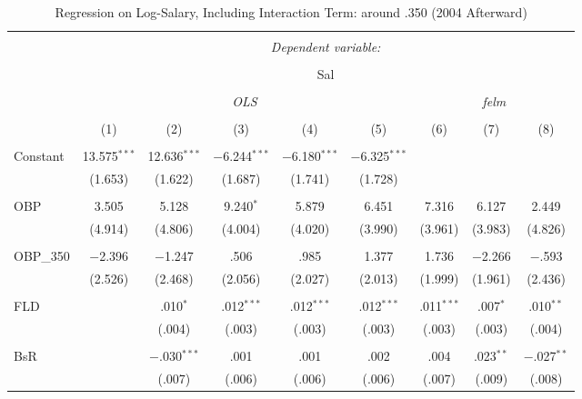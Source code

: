 
\begin{table}[H] \centering
  \caption{Regression on Log-Salary, Including Interaction Term: around .350 (2004 Afterward)} 
  \label{OBP350_D}
\tiny
\begin{tabular}{@{\extracolsep{5pt}}lcccccccc}
\\[-1.8ex]\hline
\hline \\[-1.8ex]
 & \multicolumn{8}{c}{\textit{Dependent variable:}} \\
\cline{2-9}
\\[-1.8ex] & \multicolumn{8}{c}{Sal} \\
\\[-1.8ex] & \multicolumn{5}{c}{\textit{OLS}} & \multicolumn{3}{c}{\textit{felm}} \\
\\[-1.8ex] & (1) & (2) & (3) & (4) & (5) & (6) & (7) & (8)\\
\hline \\[-1.8ex]
 Constant & 13.575$^{***}$ & 12.636$^{***}$ & $-$6.244$^{***}$ & $-$6.180$^{***}$ & $-$6.325$^{***}$ &  &  &  \\
  & (1.653) & (1.622) & (1.687) & (1.741) & (1.728) &  &  &  \\
  & & & & & & & & \\
 OBP & 3.505 & 5.128 & 9.240$^{*}$ & 5.879 & 6.451 & 7.316 & 6.127 & 2.449 \\
  & (4.914) & (4.806) & (4.004) & (4.020) & (3.990) & (3.961) & (3.983) & (4.826) \\
  & & & & & & & & \\
 OBP\_350 & $-$2.396 & $-$1.247 & .506 & .985 & 1.377 & 1.736 & $-$2.266 & $-$.593 \\
  & (2.526) & (2.468) & (2.056) & (2.027) & (2.013) & (1.999) & (1.961) & (2.436) \\
  & & & & & & & & \\
 FLD &  & .010$^{*}$ & .012$^{***}$ & .012$^{***}$ & .012$^{***}$ & .011$^{***}$ & .007$^{*}$ & .010$^{**}$ \\
  &  & (.004) & (.003) & (.003) & (.003) & (.003) & (.003) & (.004) \\
  & & & & & & & & \\
 BsR &  & $-$.030$^{***}$ & .001 & .001 & .002 & .004 & .023$^{**}$ & $-$.027$^{**}$ \\
  &  & (.007) & (.006) & (.006) & (.006) & (.007) & (.009) & (.008) \\

\end{tabular}
\end{table}
